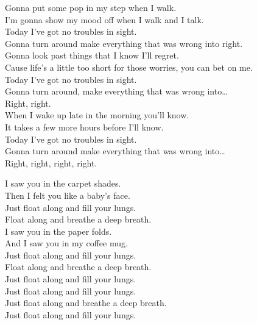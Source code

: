 Gonna put some pop in my step when I walk. \\
I'm gonna show my mood off when I walk and I talk. \\
Today I've got no troubles in sight. \\
Gonna turn around make everything that was wrong into right. \\

Gonna look past things that I know I'll regret. \\
Cause life's a little too short for those worries, you can bet on me. \\
Today I've got no troubles in sight. \\
Gonna turn around, make everything that was wrong into… \\
Right, right. \\

When I wake up late in the morning you'll know. \\
It takes a few more hours before I'll know. \\
Today I've got no troubles in sight. \\
Gonna turn around make everything that was wrong into… \\
Right, right, right, right. \\




I saw you in the carpet shades. \\
Then I felt you like a baby's face. \\
Just float along and fill your lungs. \\
Float along and breathe a deep breath. \\

I saw you in the paper folds. \\
And I saw you in my coffee mug. \\
Just float along and fill your lungs. \\
Float along and breathe a deep breath. \\

Just float along and fill your lungs. \\
Just float along and fill your lungs. \\
Just float along and breathe a deep breath. \\
Just float along and fill your lungs. \\
